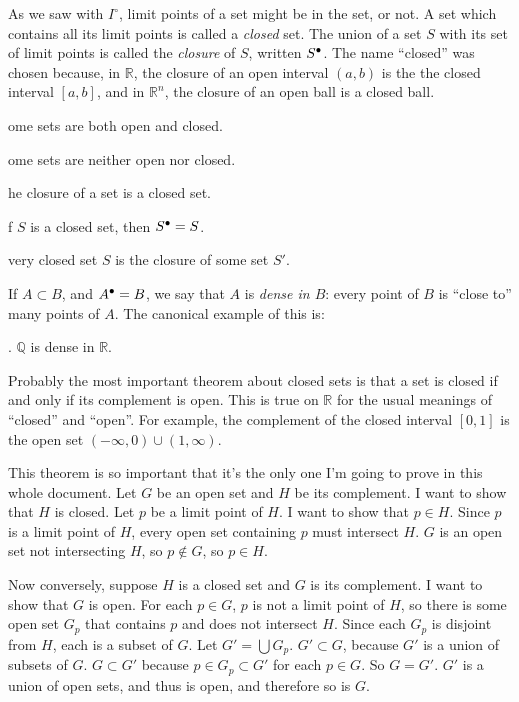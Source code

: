 \documentclass{article}
\def\R{{\mathbb R}}
\def\Rn{{\R^n}}
\newcounter{exercisecounter}\setcounter{exercisecounter}{1}
\def\Exercise.#1\par{{\item\small \makebox{\bf Exercise \number\theexercisecounter.\hspace{0.5em}}\unskip\ignorespaces#1\addtocounter{exercisecounter}{1}}}
\def\clos#1{\smash{#1}^\bullet\vphantom{#1}}
\begin{document}
As we saw with $I^\circ$, limit points of a set might be in the set,
or not.  A set which contains all its limit points is called a {\em
  closed\/} set.  The union of a set $S$ with its set of limit points
is called the {\em closure\/} of $S$, written $\clos S$.  The name
``closed'' was chosen because, in $\R$, the closure of an open interval
$(a, b)$ is the the closed interval $[a, b]$, and in $\Rn$, the closure of
an open ball is a closed ball.

\begin{itemize}
\Exercise. Some sets are both open and closed.

\Exercise. Some sets are neither open nor closed.

\Exercise. The closure of a set is a closed set.

\Exercise. If $S$ is a closed set, then $\clos S = S$.

\Exercise. Every closed set $S$ is the closure of some set $S'$. 

\end{itemize}

If $A\subset B$, and $\clos A = B$, we say that
$A$ is {\em dense in $B$}: every point of $B$ is ``close to'' many
points of  $A$.  The canonical example of this is:

\begin{itemize}
\Exercise. $\mathbb Q$ is dense in $\R$.

\end{itemize}

Probably the most important theorem about closed sets is that a set is
closed if and only if its complement is open.    This is
true on $\R$ for the usual meanings of ``closed'' and ``open''.  For
example, the complement of the closed interval $[0, 1]$ is the open
set $(-\infty, 0) \cup (1, \infty)$.

This theorem is so important that it's the only one I'm going to prove
in this whole document.  Let $G$ be an open set and $H$ be its
complement.  I want to show that $H$ is closed.  Let $p$ be a limit
point of $H$.  I want to show that $p\in H$.  Since $p$ is a limit
point of $H$, every open set containing $p$ must intersect $H$.  $G$
is an open set not intersecting $H$, so $p\not\in G$, so $p\in H$.

Now conversely, suppose $H$ is a closed set and $G$ is its
complement.  I want to show that $G$ is open.  For each $p\in G$, $p$
is not a limit point of $H$, so there is some open set $G_p$ that
contains $p$ and does not intersect $H$.  Since each $G_p$ is disjoint
from $H$, each is a subset of $G$.   Let $G'=\bigcup G_p$.  
$G'\subset G$, because $G'$ is a union of subsets of $G$.  
$G\subset G'$ because $p\in G_p\subset G'$ for each $p\in G$.
So $G=G'$.  $G'$ is a
union of open sets, and thus is open, and therefore so is $G$.
\end{document}

